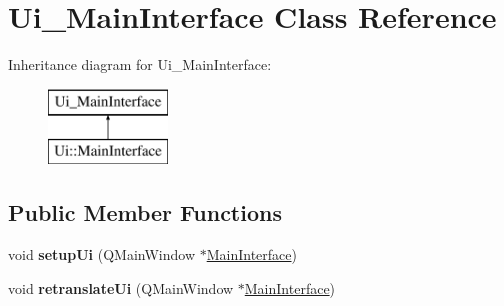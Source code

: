 \hypertarget{class_ui___main_interface}{}\section{Ui\+\_\+\+Main\+Interface Class Reference}
\label{class_ui___main_interface}
Inheritance diagram for Ui\+\_\+\+Main\+Interface\+:\begin{figure}[H]
\begin{center}
\leavevmode
\includegraphics[height=2.000000cm]{class_ui___main_interface}
\end{center}
\end{figure}
\subsection*{Public Member Functions}
\begin{DoxyCompactItemize}
\item 
\mbox{\label{class_ui___main_interface_aa8c09ad8ab5464eed7fe57eb946de29e}} 
void {\bfseries setup\+Ui} (Q\+Main\+Window $\ast$\mbox{\hyperlink{class_main_interface}{Main\+Interface}})
\item 
\mbox{\label{class_ui___main_interface_a6650721ee7cf20dc3178cd34048985ad}} 
void {\bfseries retranslate\+Ui} (Q\+Main\+Window $\ast$\mbox{\hyperlink{class_main_interface}{Main\+Interface}})
\end{DoxyCompactItemize}
